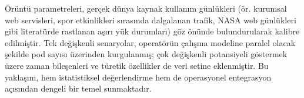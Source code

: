 Örüntü parametreleri, gerçek dünya kaynak kullanım günlükleri (ör. kurumsal web servisleri, spor etkinlikleri sırasında dalgalanan trafik, NASA web günlükleri gibi literatürde rastlanan aşırı yük durumları) göz önünde bulundurularak kalibre edilmiştir. Tek değişkenli senaryolar, operatörün çalışma modeline paralel olacak şekilde pod sayısı üzerinden kurgulanmış; çok değişkenli potansiyeli göstermek üzere zaman bileşenleri ve türetik özellikler de veri setine eklenmiştir. Bu yaklaşım, hem istatistiksel değerlendirme hem de operasyonel entegrasyon açısından dengeli bir temel sunmaktadır.

